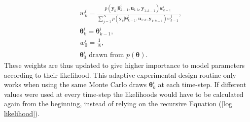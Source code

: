 \begin{equation}
\begin{aligned}
& w_k^i = \frac{p(\bm y_k|\bm \theta_{k-1}^i, \bm u_{1:k},\bm y_{1:k-1})w_{k-1}^i}{\sum_{j=1}^{N}p(\bm y_k|\bm \theta_{k-1}^j, \bm u_{1:k},\bm y_{1:k-1})w_{k-1}^j},\\
& \bm \theta_k^i = \bm \theta_{k-1}^i,\\
& w_0^i = \frac{1}{N},\\
& \bm \theta_0^i \text{ drawn from } p(\bm \theta).
\label{weight update}
\end{aligned}
\end{equation}
These weights are thus updated to give higher importance to model parameters according to their likelihood. This adaptive experimental design routine only works when using the same Monte Carlo draws $\bm \theta^i_k$ at each time-step. If different values were used at every time-step the likelihoods would have to be calculated again from the beginning, instead of relying on the recursive Equation (\ref{log likelihood}).
